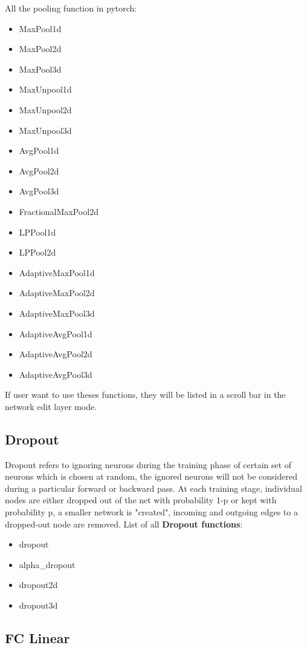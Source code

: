 All the pooling function in pytorch:
\begin{itemize}
    \item MaxPool1d
    \item MaxPool2d
    \item MaxPool3d
    \item MaxUnpool1d
    \item MaxUnpool2d
    \item MaxUnpool3d
    \item AvgPool1d
    \item AvgPool2d
    \item AvgPool3d
    \item FractionalMaxPool2d
    \item LPPool1d
    \item LPPool2d
    \item AdaptiveMaxPool1d
    \item AdaptiveMaxPool2d
    \item AdaptiveMaxPool3d
    \item AdaptiveAvgPool1d
    \item AdaptiveAvgPool2d
    \item AdaptiveAvgPool3d
\end{itemize}
If user want to use theses functions, they will be listed in a scroll bar in the network edit layer mode.

\subsection{Dropout}
Dropout refers to ignoring neurons during the training phase of certain set of neurons which is chosen at random, the ignored neurons will not be considered during a particular forward or backward pass.
\newline
 At each training stage, individual nodes are either dropped out of the net with probability 1-p or kept with probability p, a smaller network is "created", incoming and outgoing edges to a dropped-out node are removed.
 \newline
 List of all \textbf{Dropout functions}:
 \begin{itemize}
     \item dropout
     \item alpha\_dropout
     \item dropout2d
    \item dropout3d
 \end{itemize}
\subsection{FC Linear}
